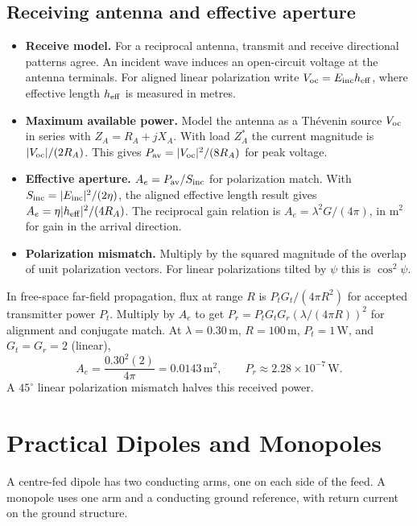 \documentclass[12pt,a4paper]{article}
\begin{document}
\subsection{Receiving antenna and effective aperture}
\begin{itemize}[leftmargin=*,itemsep=3pt]
\item \textbf{Receive model.} For a reciprocal antenna, transmit and receive directional patterns agree. An incident wave induces an open-circuit voltage at the antenna terminals. For aligned linear polarization write $V_{\rm oc}=E_{\rm inc}h_{\rm eff}$, where effective length $h_{\rm eff}$ is measured in metres.
\item \textbf{Maximum available power.} Model the antenna as a Th\'evenin source $V_{\rm oc}$ in series with $Z_A=R_A+jX_A$. With load $Z_A^*$ the current magnitude is $|V_{\rm oc}|/(2R_A)$. This gives $P_{\rm av}=|V_{\rm oc}|^2/(8R_A)$ for peak voltage.
\item \textbf{Effective aperture.} $A_e=P_{\rm av}/S_{\rm inc}$ for polarization match. With $S_{\rm inc}=|E_{\rm inc}|^2/(2\eta)$, the aligned effective length result gives $A_e=\eta|h_{\rm eff}|^2/(4R_A)$. The reciprocal gain relation is $A_e=\lambda^2G/(4\pi)$, in $\mathrm{m^2}$ for gain in the arrival direction.
\item \textbf{Polarization mismatch.} Multiply by the squared magnitude of the overlap of unit polarization vectors. For linear polarizations tilted by $\psi$ this is $\cos^2\psi$.
\end{itemize}
\begin{tcolorbox}[examplebox,title={Friis relation and received power}]
In free-space far-field propagation, flux at range $R$ is $P_t G_t/(4\pi R^2)$ for accepted transmitter power $P_t$. Multiply by $A_e$ to get $P_r=P_tG_tG_r(\lambda/(4\pi R))^2$ for alignment and conjugate match. At $\lambda=0.30\,\mathrm m$, $R=100\,\mathrm m$, $P_t=1\,\mathrm W$, and $G_t=G_r=2$ (linear),
\[
 A_e=\frac{0.30^2(2)}{4\pi}=0.0143\,\mathrm{m^2},
 \qquad P_r\approx2.28\times10^{-7}\,\mathrm W.
\]
A $45^\circ$ linear polarization mismatch halves this received power.
\end{tcolorbox}

\section{Practical Dipoles and Monopoles}
\begin{tcolorbox}[defbox,title={Dipole and monopole}]
A centre-fed dipole has two conducting arms, one on each side of the feed. A monopole uses one arm and a conducting ground reference, with return current on the ground structure.
\end{tcolorbox}
\end{document}
